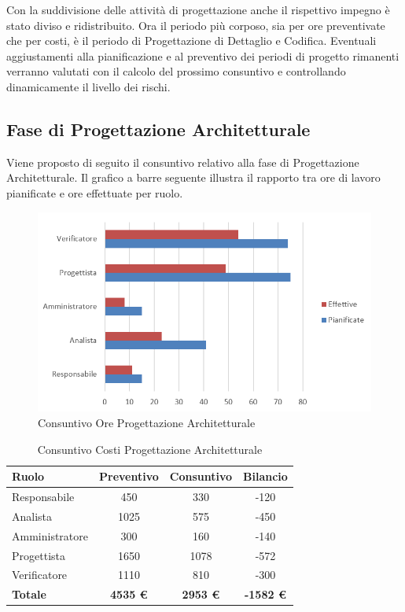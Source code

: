 \documentclass[a4paper,11pt]{article}
\begin{document}
	Con la suddivisione delle attività di progettazione anche il rispettivo impegno è stato diviso e ridistribuito. Ora il periodo più corposo, sia per ore preventivate che per costi, è il periodo di Progettazione di Dettaglio e Codifica. Eventuali aggiustamenti alla pianificazione e al preventivo dei periodi di progetto rimanenti verranno valutati con il calcolo del prossimo consuntivo e controllando dinamicamente il livello dei rischi.
	
	\newpage
	
	\subsection{Fase di Progettazione Architetturale}
	Viene proposto di seguito il consuntivo relativo alla fase di Progettazione Architetturale. Il grafico a barre seguente illustra il rapporto tra ore di lavoro pianificate e ore effettuate per
ruolo. 	
	
	\begin{figure}[h!]
		\centering
		\includegraphics[scale=0.7]{../Images/chart-Consuntivo_Ore_Progettazione}
	\caption{Consuntivo Ore Progettazione Architetturale}
	\end{figure}
	
	\begin{table}[h!]
	\begin{center}
		\begin{tabular}{l c c c}
			\textbf{Ruolo} & \textbf{Preventivo} & \textbf{Consuntivo} &\textbf{Bilancio}\\
			\midrule
			Responsabile 	& 450 	& 330	& -120	\\
			Analista 		& 1025 	& 575	& -450	\\
			Amministratore 	& 300 	& 160	& -140	\\			
			Progettista 	& 1650 	& 1078	& -572	\\
			Verificatore 	& 1110 	& 810	& -300	\\
			\midrule
			\textbf{Totale} & \textbf{4535 \euro} & \textbf{2953 \euro}	& \textbf{-1582 \euro}
		\end{tabular}
		\end{center}
	\caption{Consuntivo Costi Progettazione Architetturale}
	\end{table}
	
\end{document}
